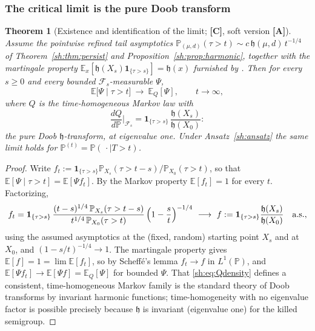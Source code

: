\documentclass[11pt]{article}
\numberwithin{equation}{section}
\theoremstyle{plain}
\newtheorem{theorem}{Theorem}[section]
\theoremstyle{definition}
\theoremstyle{remark}
\newcommand{\E}{\mathbb{E}}
\newcommand{\PP}{\mathbb{P}}
\newcommand{\one}{\mathbf{1}}
\newcommand{\Fc}{\mathcal{F}}
\newcommand{\hm}{\mathfrak{h}}
\begin{document}
\subsubsection{The critical limit is the pure Doob transform}
\label{sh:subsub:Q}

\begin{theorem}[Existence and identification of the limit;
\textbf{[C]}, soft version \textbf{[A]}]\label{sh:thm:Q}
Assume the pointwise refined tail asymptotics
$\PP_{(\mu,d)}(\tau>t)\sim c\,\hm(\mu,d)\,t^{-1/4}$ of
Theorem~\ref{sh:thm:persist} and
Proposition~\ref{sh:prop:harmonic}, together with the martingale property
$\E_{x}[\hm(X_s)\one_{\{\tau>s\}}]=\hm(x)$ furnished by \cite{GJW99}.
Then for every $s\ge0$ and every bounded $\Fc_s$-measurable $\Psi$,
\[
\E\bigl[\Psi\mid\tau>t\bigr]\ \longrightarrow\ \E_Q[\Psi],
\qquad t\to\infty,
\]
where $Q$ is the time-homogeneous Markov law with
\begin{equation}\label{sh:eq:Qdensity}
\frac{dQ}{d\PP}\Big|_{\Fc_s}
=\one_{\{\tau>s\}}\,\frac{\hm(X_s)}{\hm(X_0)} :
\end{equation}
the \emph{pure} Doob $\hm$-transform, at eigenvalue one. Under
Ansatz~\ref{sh:ansatz} the same limit holds for
$\PP^{(t)}=\PP(\,\cdot\mid T>t)$.
\end{theorem}

\begin{proof}
Write $f_t:=\one_{\{\tau>s\}}\PP_{X_s}(\tau>t-s)/\PP_{X_0}(\tau>t)$, so
that $\E[\Psi\mid\tau>t]=\E[\Psi f_t]$. By the Markov property
$\E[f_t]=1$ for every $t$. Factorizing,
\[
f_t=\one_{\{\tau>s\}}\,
\frac{(t-s)^{1/4}\,\PP_{X_s}(\tau>t-s)}{t^{1/4}\,\PP_{X_0}(\tau>t)}
\,\Bigl(1-\frac st\Bigr)^{-1/4}
\ \longrightarrow\
f:=\one_{\{\tau>s\}}\frac{\hm(X_s)}{\hm(X_0)}
\quad\text{a.s.},
\]
using the assumed asymptotics at the (fixed, random) starting point
$X_s$ and at $X_0$, and $(1-s/t)^{-1/4}\to1$. The martingale property
gives $\E[f]=1=\lim\E[f_t]$, so by Scheff\'e's lemma $f_t\to f$ in
$L^1(\PP)$, and $\E[\Psi f_t]\to\E[\Psi f]=\E_Q[\Psi]$ for bounded
$\Psi$. That \eqref{sh:eq:Qdensity} defines a consistent, time-homogeneous
Markov family is the standard theory of Doob transforms by invariant
harmonic functions; time-homogeneity with no eigenvalue factor is
possible precisely because $\hm$ is invariant (eigenvalue one) for the
killed semigroup.
\end{proof}
\end{document}
